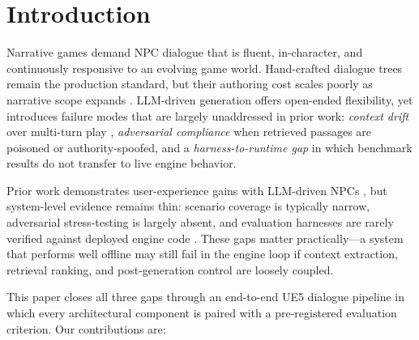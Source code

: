 \documentclass[conference]{IEEEtran}
\begin{document}
\section{Introduction}

Narrative games demand NPC dialogue that is fluent, in-character,
and continuously responsive to an evolving game world. Hand-crafted
dialogue trees remain the production standard, but their authoring
cost scales poorly as narrative scope expands
\cite{Gallotta2024Survey,Sweetser2024Scoping}. LLM-driven
generation offers open-ended flexibility, yet introduces
failure modes that are largely unaddressed in prior work:
\textit{context drift} over multi-turn play
\cite{Park2023GenerativeAgents}, \textit{adversarial compliance}
when retrieved passages are poisoned or authority-spoofed, and
a \textit{harness-to-runtime gap} in which benchmark results do
not transfer to live engine behavior.

Prior work demonstrates user-experience gains with LLM-driven NPCs
\cite{Rao2024Minecraft,Christiansen2024Presence,Wevelsiep2025Voice},
but system-level evidence remains thin: scenario coverage is
typically narrow, adversarial stress-testing is largely absent,
and evaluation harnesses are rarely verified against deployed
engine code \cite{Gallotta2024Survey}. These gaps matter
practically---a system that performs well offline may still fail
in the engine loop if context extraction, retrieval ranking, and
post-generation control are loosely coupled.

This paper closes all three gaps through an end-to-end UE5
dialogue pipeline in which every architectural component is
paired with a pre-registered evaluation criterion. Our
contributions are:
\end{document}
